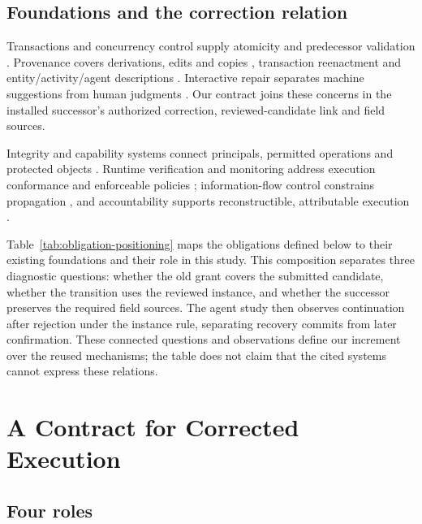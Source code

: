 \subsection{Foundations and the correction relation}\label{foundations-and-the-correction-relation}

Transactions and concurrency control supply atomicity and predecessor validation \citep{gray-transaction,kung-occ}. Provenance covers derivations, edits and copies \citep{buneman-provenance,cheney-provenance,buneman-curated}, transaction reenactment \citep{arab-reenactment} and entity/activity/agent descriptions \citep{prov-dm}. Interactive repair separates machine suggestions from human judgments \citep{yakout-guided-repair,falcon-cleaning}. Our contract joins these concerns in the installed successor's authorized correction, reviewed-candidate link and field sources.

Integrity and capability systems connect principals, permitted operations and protected objects \citep{clark-wilson,hardy-confused-deputy,miller-robust-composition}. Runtime verification and monitoring address execution conformance and enforceable policies \citep{runtime-verification,policy-enforcement}; information-flow control constrains propagation \citep{ifc}, and accountability supports reconstructible, attributable execution \citep{accountability}.

Table~\ref{tab:obligation-positioning} maps the obligations defined below to their existing foundations and their role in this study. This composition separates three diagnostic questions: whether the old grant covers the submitted candidate, whether the transition uses the reviewed instance, and whether the successor preserves the required field sources. The agent study then observes continuation after rejection under the instance rule, separating recovery commits from later confirmation. These connected questions and observations define our increment over the reused mechanisms; the table does not claim that the cited systems cannot express these relations.



\section{A Contract for Corrected Execution}\label{a-contract-for-corrected-execution}

\subsection{Four roles}\label{four-roles}


